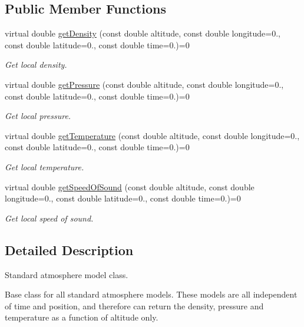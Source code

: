 \subsection*{Public Member Functions}
\begin{DoxyCompactItemize}
\item 
virtual double \hyperlink{classtudat_1_1aerodynamics_1_1StandardAtmosphere_a85b7e8803277496e8f5abc9bb36d5bf6}{get\+Density} (const double altitude, const double longitude=0., const double latitude=0., const double time=0.)=0
\begin{DoxyCompactList}\small\item\em Get local density. \end{DoxyCompactList}\item 
virtual double \hyperlink{classtudat_1_1aerodynamics_1_1StandardAtmosphere_aedd2b6b8824cebea8dea628bfec0e236}{get\+Pressure} (const double altitude, const double longitude=0., const double latitude=0., const double time=0.)=0
\begin{DoxyCompactList}\small\item\em Get local pressure. \end{DoxyCompactList}\item 
virtual double \hyperlink{classtudat_1_1aerodynamics_1_1StandardAtmosphere_ac5b9a16a96cbb496a4ee76b3dc495543}{get\+Temperature} (const double altitude, const double longitude=0., const double latitude=0., const double time=0.)=0
\begin{DoxyCompactList}\small\item\em Get local temperature. \end{DoxyCompactList}\item 
virtual double \hyperlink{classtudat_1_1aerodynamics_1_1StandardAtmosphere_a9992c99f7994882307b05161e19fc298}{get\+Speed\+Of\+Sound} (const double altitude, const double longitude=0., const double latitude=0., const double time=0.)=0
\begin{DoxyCompactList}\small\item\em Get local speed of sound. \end{DoxyCompactList}\end{DoxyCompactItemize}


\subsection{Detailed Description}
Standard atmosphere model class. 

Base class for all standard atmosphere models. These models are all independent of time and position, and therefore can return the density, pressure and temperature as a function of altitude only. 

